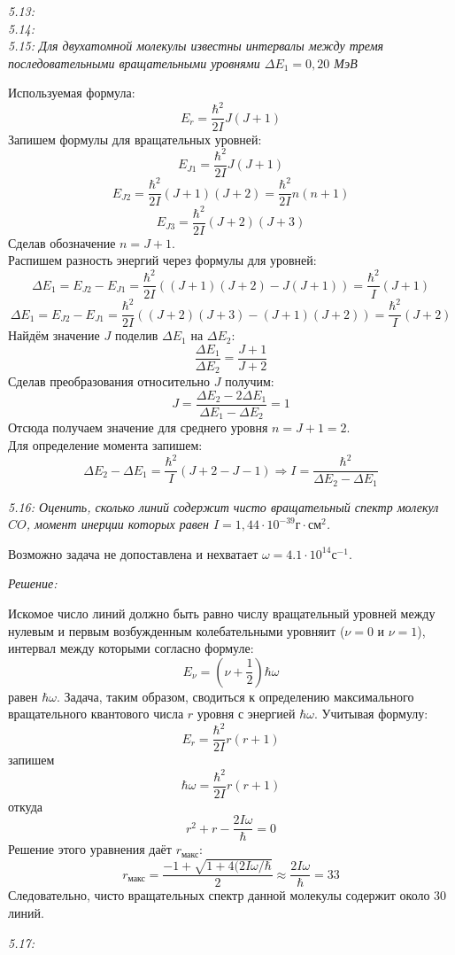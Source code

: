 	\emph{5.13: } \\

	\emph{5.14: } \\

	\emph{5.15: Для двухатомной молекулы известны интервалы между 
        тремя последовательными вращательными уровнями \( \Delta E_1 = 
        0,20 \) МэВ }
        
		Используемая формула: \[ E_r = \frac{\hbar^2}{2I}J(J+1) \]
		Запишем формулы для вращательных уровней:
		\[ E_{J1} = \frac{\hbar^2}{2I}J(J+1) \]
		\[ E_{J2} = \frac{\hbar^2}{2I}(J+1)(J+2) = \frac{\hbar^2}{2I}n(n+1) \]
		\[ E_{J3} = \frac{\hbar^2}{2I}(J+2)(J+3) \]
		Сделав обозначение \( n = J + 1 \). \\
		Распишем разность энергий через формулы для уровней:
		\[ 
			\Delta E_1 = E_{J2} - E_{J1} = 
			\frac{\hbar^2}{2I}((J+1)(J+2) - J(J+1)) = \frac{\hbar^2}{I}(J+1) 
		\]
		\[ 
			\Delta E_1 = E_{J2} - E_{J1} =
			\frac{\hbar^2}{2I}((J+2)(J+3)-(J+1)(J+2)) = \frac{\hbar^2}{I}(J+2)
		\]
		Найдём значение \( J \) поделив \( \Delta E_1 \) на \( \Delta E_2 \):
		\[ \frac{\Delta E_1}{\Delta E_2} = \frac{J+1}{J+2} \]
		Сделав преобразования относительно \( J \) получим:
		\[ J = \frac{\Delta E_2 - 2\Delta E_1}{\Delta E_1 - \Delta E_2} = 1 \]
		Отсюда получаем значение для среднего уровня \( n = J+1 = 2 \). \\
		Для определение момента запишем: 
		\[ 
			\Delta E_2 - \Delta E_1 = \frac{\hbar^2}{I}(J+2-J-1) 
			\Rightarrow I = \frac{\hbar^2}{\Delta E_2 - \Delta E_1}
		\]

	\emph{5.16: Оценить, сколько линий содержит чисто вращательный 
        спектр молекул \( CO \), момент инерции которых равен 
        \( I = 1,44\cdot10^{-39} \text{г}\cdot\text{см}^2 \).}

        Возможно задача не допоставлена и нехватает
        \( \omega = 4.1\cdot10^{14} \text{с}^{-1} \). 

        \emph{Решение:}

        Искомое число линий должно быть равно числу вращательный уровней 
        между нулевым и первым возбужденным колебательными уровняит 
        (\( \nu = 0 \) и \( \nu = 1 \)), интервал между которыми согласно 
        формуле: 
        \[ E_\nu = (\nu + \frac{1}{2})\hbar\omega \]
        равен \( \hbar\omega \). Задача, таким образом, сводиться к 
        определению максимального вращательного квантового числа \( r \) 
        уровня с энергией \( \hbar\omega \). Учитывая формулу:
        \[ E_r = \frac{\hbar^2}{2I}r(r+1) \]
        запишем 
        \[ \hbar\omega = \frac{\hbar^2}{2I}r(r+1) \]
        откуда 
        \[ r^2 + r - \frac{2I\omega}{\hbar} = 0 \]
        Решение этого уравнения даёт \( r_{\text{макс}} \):
        \[ 
            r_\text{макс} = \frac{-1 + 
            \sqrt{1+4(2I\omega/\hbar}}{2} \approx 
            \frac{2I\omega}{\hbar} = 33
        \]
        Следовательно, чисто вращательных спектр данной молекулы 
        содержит около 30 линий.

	\emph{5.17: } \\


